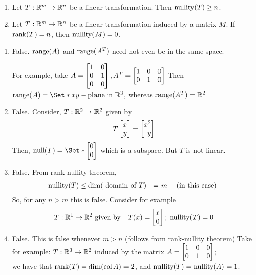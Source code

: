 \begin{exercises}
\begin{problist}
\begin{enumerate}
			\item Let $T:\mathbb{R}^{m}\to\mathbb{R}^{n}$ be a linear transformation. Then
				$\operatorname{nullity}(T) \geq n$.

			\item Let $T:\mathbb{R}^{m}\to\mathbb{R}^{n}$ be a linear transformation induced by a
				matrix $M$. If $\operatorname{rank}(T) = n$, then $\operatorname{nullity}(M) = 0$.
		\end{enumerate}

		\begin{solution}
			\begin{enumerate}
				\item False. $\operatorname{range}(A)$ and $\operatorname{range}(A^{T})$ need not even be in
					the same space.

					For example, take $A=\mat{1&0\\0&1\\0&0}, A^{T}=\mat{1&0&0\\0&1&0}$
					Then $\Range(A)=\Set*{xy-\text{plane in }\R^3}$, whereas
					$\operatorname{range}(A^{T})=\mathbb{R}^{2}$

				\item False. Consider, $T:\mathbb{R}^{2}\to\mathbb{R}^{2}$ given by
					\[
						T\mat{x\\y}=\mat{x^2\\y}
					\]
					Then, $\Null(T)= \Set*{\mat{0\\0}}$ which is a subspace. But
					$T$ is not linear.

				\item False. From rank-nullity theorem,
					\begin{align*}
						\operatorname{nullity}(T) & \leq \operatorname{dim}(\text{ domain of }T) & =m \quad \text{ (in this case) }
					\end{align*}So, for any $n>m$ this is false. Consider for
					example
					\begin{align*}
						 & T:\R^{1}\to\R^{2}\;\text{given by} & T(x)=\mat{x\\0};\; \Nullity(T)=0
					\end{align*}

				\item False. This is false whenever $m>n$ (follows from rank-nullity
					theorem) Take for example: $T:\mathbb{R}^{3}\to\mathbb{R}^{2}$ induced by the
					matrix $A=\mat{1&0&0\\0&1&0}$;\\ we have that $\operatorname{rank}(T)=\operatorname{dim}(
					\operatorname{col} A)=2$, and $\operatorname{nullity}(T) = \operatorname{nullity}(A)=1$.
			\end{enumerate}
		\end{solution}


\end{problist}
\end{exercises}
